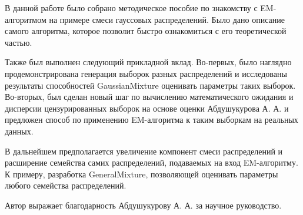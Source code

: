     В данной работе было собрано методическое пособие по знакомству с EM-алгоритмом на примере смеси гауссовых распределений. Было дано описание самого алгоритма, которое позволит быстро ознакомиться с его теоретической частью.
    
    Также был выполнен следующий прикладной вклад. Во-первых, было наглядно продемонстрирована генерация выборок разных распределений и исследованы результаты способностей GaussianMixture оценивать параметры таких выборок. Во-вторых, был сделан новый шаг по вычислению математического ожидания и дисперсии цензурированных выборок на основе оценки Абдушукурова А. А. и предложен способ по применению EM-алгоритма к таким выборкам на реальных данных.
    
    В дальнейшем предполагается увеличение компонент смеси распределений и расширение семейства самих распределений, подаваемых на вход EM-алгоритму. К примеру, разработка GeneralMixture, позволяющей оценивать параметры любого семейства распределений.
    
    Автор выражает благодарность Абдушукурову А. А. за научное руководство.